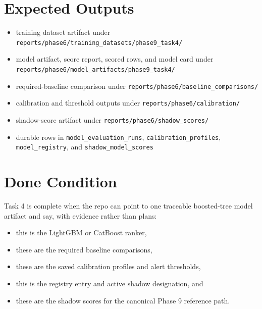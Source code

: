 \documentclass{article}
\begin{document}
\section*{Expected Outputs}
\begin{itemize}
\item training dataset artifact under \texttt{reports/phase6/training\_datasets/phase9\_task4/}
\item model artifact, score report, scored rows, and model card under \texttt{reports/phase6/model\_artifacts/phase9\_task4/}
\item required-baseline comparison under \texttt{reports/phase6/baseline\_comparisons/}
\item calibration and threshold outputs under \texttt{reports/phase6/calibration/}
\item shadow-score artifact under \texttt{reports/phase6/shadow\_scores/}
\item durable rows in \texttt{model\_evaluation\_runs}, \texttt{calibration\_profiles}, \texttt{model\_registry}, and \texttt{shadow\_model\_scores}
\end{itemize}

\section*{Done Condition}
Task 4 is complete when the repo can point to one traceable boosted-tree model artifact and say, with evidence rather than plans:
\begin{itemize}
\item this is the LightGBM or CatBoost ranker,
\item these are the required baseline comparisons,
\item these are the saved calibration profiles and alert thresholds,
\item this is the registry entry and active shadow designation, and
\item these are the shadow scores for the canonical Phase 9 reference path.
\end{itemize}
\end{document}
